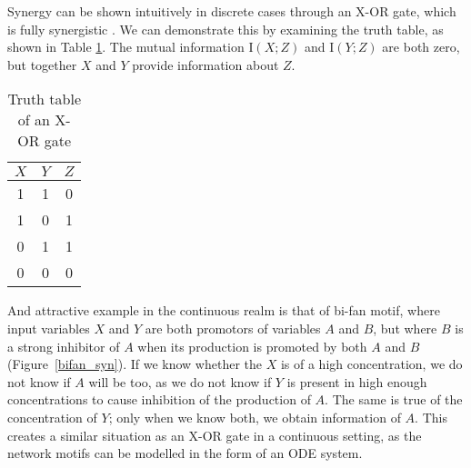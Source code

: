 \documentclass[../main.tex]{subfiles}
\begin{document}
Synergy can be shown intuitively in discrete cases through an X-OR gate, which is fully synergistic \cite{quax2017quantifying}.
We can demonstrate this by examining the truth table, as shown in Table \ref{XOR}.
The mutual information $\mathrm{I}(X;Z)$ and $\mathrm{I}(Y;Z)$ are both zero, but together $X$ and $Y$ provide information about $Z$.

\begin{table}[ht]
\begin{center}
\begin{tabular}{|c|c||c|}
\hline
$X$ & $Y$ & $Z$ \\
\hline
\hline
1 & 1 & 0 \\
1 & 0 & 1 \\
0 & 1 & 1 \\
0 & 0 & 0 \\
\hline
\end{tabular}
\end{center}
\caption{Truth table of an X-OR gate}
\label{XOR}
\end{table}

And attractive example in the continuous realm is that of bi-fan motif, where input variables $X$ and $Y$ are both promotors of variables $A$ and $B$, but where $B$ is a strong inhibitor of $A$ when its production is promoted by both $A$ and $B$ (Figure~\ref{bifan_syn}).
If we know whether the $X$ is of a high concentration, we do not know if $A$ will be too, as we do not know if $Y$ is present in high enough concentrations to cause inhibition of the production of $A$.
The same is true of the concentration of $Y$; only when we know both, we obtain information of $A$.
This creates a similar situation as an X-OR gate in a continuous setting, as the network motifs can be modelled in the form of an ODE system.
\end{document}
